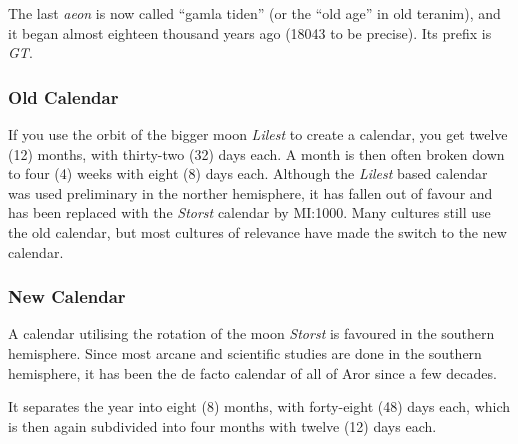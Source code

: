 The last \emph{aeon} is now called ``gamla tiden'' (or the ``old age'' in old
teranim), and it began almost eighteen thousand years ago (18043 to be
precise). Its prefix is \emph{GT}.

\subsubsection{Old Calendar}
\label{sec:Old Calendar}

If you use the orbit of the bigger moon \emph{Lilest} to create a
calendar, you get twelve (12) months, with thirty-two (32) days
each. A month is then often broken down to four (4) weeks with eight
(8) days each. Although the \emph{Lilest} based calendar was used
preliminary in the norther hemisphere, it has fallen out of favour and
has been replaced with the \emph{Storst} calendar by MI:1000. Many
cultures still use the old calendar, but most cultures of relevance
have made the switch to the new calendar.

\subsubsection{New Calendar}
\label{sec:New Calendar}

A calendar utilising the rotation of the moon \emph{Storst} is favoured
in the southern hemisphere. Since most arcane and scientific studies are
done in the southern hemisphere, it has been the de facto calendar of all
of Aror since a few decades.

It separates the year into eight (8) months, with forty-eight (48) days
each, which is then again subdivided into four months with twelve (12)
days each.





